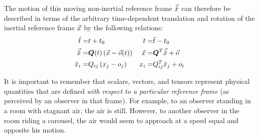 The motion of this moving non-inertial reference frame $\vec{{{{\hat{x}}}}}$
can therefore be described in terms of the
arbitrary time-dependent translation and rotation of the
inertial reference frame $\vec{{{{x}}}}$
by the following relations:
\begin{align}
    {\hat{t}}   =& {t} + t_0 &
    {t}   =& {\hat{t}} - t_0 \\
    \vec{{{{\hat{x}}}}}   =& {{\bm{{{{Q}}}}}}(t)
                 \left( \vec{{{{x}}}} - \vec{{{{o}}}}(t) \right) &
    \vec{{{{x}}}}   =& {{\bm{{{{Q}}}}}}^T
                        \vec{{{{\hat{x}}}}} + \vec{{{{o}}}}    \\
    \label{EQ:MovingCoords}
    {\hat{x}}_i =& {{{{Q}}}}_{ij}
                 \left( {{{{x}}}}_{j} - {{{{o}}}}_{j} \right) &
    {x}_i =& {{{{Q}}}}_{ij}^T
                        {{{{\hat{x}}}}}_{j} + {{{{o}}}}_{i}
\end{align}


It is important to remember that scalars, vectors, and tensors represent
physical quantities that are defined {\em with respect to a particular
reference frame} (\thatis as perceived by an observer in that frame).
%
For example, to an observer standing in a room with stagnant air, the air
is still. However, to another observer in the room riding a carousel, the
air would seem to approach at a speed equal and opposite his motion.
 
